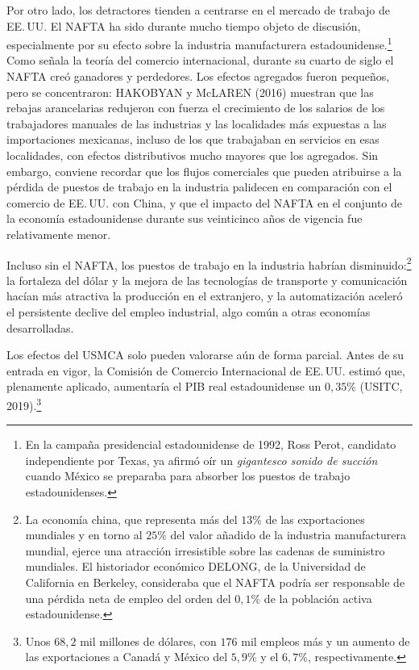 \documentclass[10pt,a4paper]{article}
\begin{document}
Por otro lado, los detractores tienden a centrarse en el mercado de trabajo de EE.\,UU. El NAFTA ha sido durante mucho tiempo objeto de discusión, especialmente por su efecto sobre la industria manufacturera estadounidense.\footnote{%
    En la campaña presidencial estadounidense de 1992, Ross Perot, candidato independiente por Texas, ya afirmó oír un \textit{gigantesco sonido de succión} cuando México se preparaba para absorber los puestos de trabajo estadounidenses.
} Como señala la teoría del comercio internacional, durante su cuarto de siglo el NAFTA creó ganadores y perdedores. Los efectos agregados fueron pequeños, pero se concentraron: HAKOBYAN y McLAREN (2016) muestran que las rebajas arancelarias redujeron con fuerza el crecimiento de los salarios de los trabajadores manuales de las industrias y las localidades más expuestas a las importaciones mexicanas, incluso de los que trabajaban en servicios en esas localidades, con efectos distributivos mucho mayores que los agregados. Sin embargo, conviene recordar que los flujos comerciales que pueden atribuirse a la pérdida de puestos de trabajo en la industria palidecen en comparación con el comercio de EE.\,UU. con China, y que el impacto del NAFTA en el conjunto de la economía estadounidense durante sus veinticinco años de vigencia fue relativamente menor.

Incluso sin el NAFTA, los puestos de trabajo en la industria habrían disminuido:\footnote{%
    La economía china, que representa más del $13\%$ de las exportaciones mundiales y en torno al $25\%$ del valor añadido de la industria manufacturera mundial, ejerce una atracción irresistible sobre las cadenas de suministro mundiales. El historiador económico DELONG, de la Universidad de California en Berkeley, consideraba que el NAFTA podría ser responsable de una pérdida neta de empleo del orden del $0,1\%$ de la población activa estadounidense.
} la fortaleza del dólar y la mejora de las tecnologías de transporte y comunicación hacían más atractiva la producción en el extranjero, y la automatización aceleró el persistente declive del empleo industrial, algo común a otras economías desarrolladas.

Los efectos del USMCA solo pueden valorarse aún de forma parcial. Antes de su entrada en vigor, la Comisión de Comercio Internacional de EE.\,UU. estimó que, plenamente aplicado, aumentaría el PIB real estadounidense un $0,35\%$ (USITC, 2019).\footnote{%
    Unos $68,2$ mil millones de dólares, con $176$ mil empleos más y un aumento de las exportaciones a Canadá y México del $5,9\%$ y el $6,7\%$, respectivamente.
} 
\end{document}
